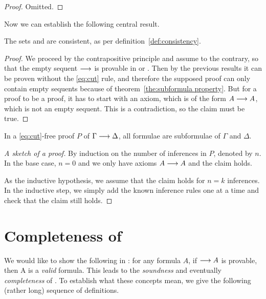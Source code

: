 \documentclass[11pt,a4paper]{article}
\begin{document}
\begin{proof}
    Omitted.
\end{proof}

Now we can establish the following central result.

\begin{theorem}\label{eq:consistency of LK and LJ}
    The sets \LK{} and \LJ{} are consistent,
    as per definition~\ref{def:consistency}.
\end{theorem}

\begin{proof}
    We proceed by the contrapositive principle and
    assume to the contrary, so that the empty sequent \(\longrightarrow\)
    is provable in \LK{} or \LJ{}. Then by the previous results
    it can be proven without the \eqref{eq:cut} rule,
    and therefore the supposed proof can only contain empty sequents
    because of theorem~\ref{the:subformula property}.
    But for a proof to be a proof, it has to start with an
    axiom, which is of the form \(A\longrightarrow A\),
    which is not an empty sequent. This is a contradiction,
    so the claim must be true.
\end{proof}

\begin{theorem}\label{the:6.3}
    In a \eqref{eq:cut}-free proof \(P\) of \(\Gamma\longrightarrow\Delta\),
    all formulae are subformulae of \(\Gamma\) and \(\Delta\).
\end{theorem}

\begin{proof}[A sketch of a proof]
    By induction on the number of inferences in \(P\),
    denoted by \(n\). In the base case, \(n=0\)
    and we only have axioms \(A\longrightarrow A\) and the claim holds.

    As the inductive hypothesis, we assume that the claim holds
    for \(n=k\) inferences. In the inductive step, we simply
    add the known inference rules one at a time and check that
    the claim still holds.
\end{proof}

\section{\texorpdfstring{Completeness of \LK}{Completeness of LK}}

We would like to show the following in \LK:
for any formula \(A\), if \(\longrightarrow A\) is provable,
then A is a \emph{valid} formula.
This leads to the \emph{soundness} and eventually \emph{completeness} of \LK.
To establish what these concepts mean, we give the following
(rather long) sequence of definitions.
\end{document}
